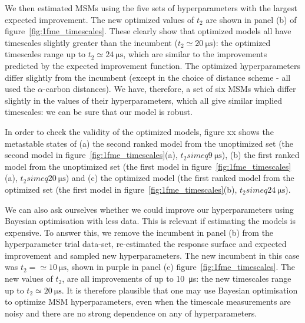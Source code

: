 \documentclass[journal=jacsat,manuscript=article]{achemso}
\begin{document}
We then estimated MSMs using the five sets of hyperparameters with the largest expected improvement. The new optimized values of $t_2$ are shown in panel (b) of figure~\ref{fig:1fme_timescales}.  These clearly show that optimized models all have timescales slightly greater than the incumbent ($t_2 \simeq \SI{20}{\micro\second}$):  the optimized timescales range up to $t_2 \simeq \SI{24}{\micro\second}$, which are similar to the improvements predicted by the expected improvement function. The optimized hyperparameters differ slightly from the incumbent (except in the choice of distance scheme - all used the $\alpha$-carbon distances). We have, therefore, a set of six MSMs which differ slightly in the values of their hyperparameters, which all give similar implied timescales: we can be sure that our model is robust. 

In order to check the validity of the optimized models, figure xx shows the metastable states of (a) the second ranked model from the unoptimized set (the second model in figure~\ref{fig:1fme_timescales}(a), $t_2 simeq \SI{9}{\micro\second}$), (b) the first ranked model from the unoptimized set (the first model in figure~\ref{fig:1fme_timescales}(a), $t_2 simeq \SI{20}{\micro\second}$) and (c) the optimized model (the first ranked model from the optimized set (the first model in figure~\ref{fig:1fme_timescales}(b), $t_2 simeq \SI{24}{\micro\second}$). 

We can also ask ourselves whether we could improve our hyperparameters using Bayesian optimisation with less data. This is relevant if estimating the models is expensive. To answer this, we remove the incumbent in panel (b) from the hyperparameter trial data-set, re-estimated the response surface and expected improvement and sampled new hyperparameters. The new incumbent in this case was $t_2 = \simeq \SI{10}{\micro\second}$, shown in purple in panel (c) figure~\ref{fig:1fme_timescales}.  The new values of $t_2$,  are all improvements of up to \SI{10}{\micro\second}: the new timescales range up to $t_2 \simeq \SI{20}{\micro\second}$. It is therefore plausible that one may use Bayesian optimisation to optimize MSM hyperparameters, even when the timescale measurements are noisy and there are no strong dependence on any of hyperparameters.  
\end{document}
